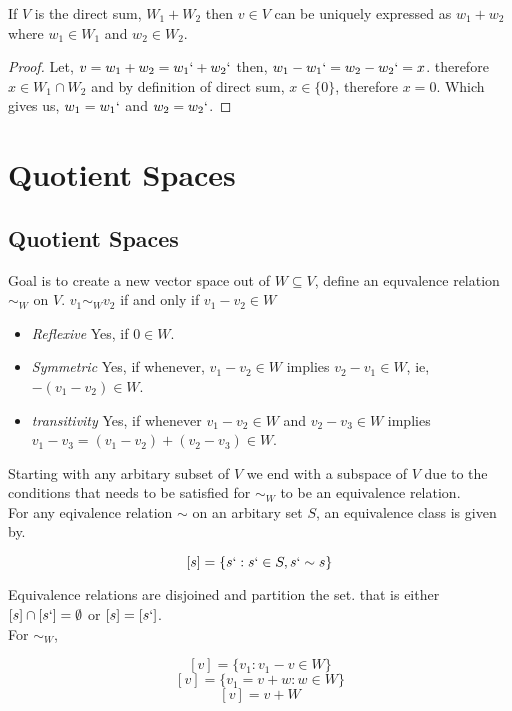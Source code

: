 \documentclass[11pt,a4paper]{colorart}
\def\l{\left}
\def\r{\right}
\def\es{\emptyset}
\begin{document}
\begin{proposition}
	If $V$ is the direct sum, $W_1+W_2$ then $v\in V$ can be uniquely expressed as $w_1+w_2$ where $w_1\in W_1$ and $w_2\in W_2$.
\end{proposition}

\begin{proof}
	Let, $v = w_1 + w_2 = w_1` + w_2`$ then, $w_1 - w_1` = w_2 - w_2` = x$. therefore $x\in W_1 \cap W_2$ and by definition of direct sum, $x \in \{0\}$, therefore $x=0$. Which gives us, $w_1 = w_1`$ and $w_2=w_2`$.
\end{proof}

\section{Quotient Spaces}

\subsection{Quotient Spaces}

Goal is to create a new vector space out of $W\subseteq V$, define an equvalence relation $\sim _W$ on $V$. $v_1 \sim_W v_2$ if and only if $v_1-v_2\in W$

\begin{itemize}
	\item \textit{Reflexive}
		Yes, if $0\in W$.
	\item \textit{Symmetric}
		Yes, if whenever, $v_1-v_2\in W$ implies $v_2-v_1\in W$, ie, $-\l(v_1-v_2\r)\in W$.
	\item \textit{transitivity}
		Yes, if whenever $v_1-v_2\in W$ and $v_2-v_3\in W$ implies $v_1-v_3 = \l(v_1-v_2\r) + \l(v_2-v_3\r) \in W$.
\end{itemize}

Starting with any arbitary subset of $V$ we end with a subspace of $V$ due to the conditions that needs to be satisfied for $\sim_W$ to be an equivalence relation.\\

For any eqivalence relation $\sim$ on an arbitary set $S$, an equivalence class is given by.

\[ \l[s\r] = \{s`:s`\in S, s` \sim s \} \]

Equivalence relations are disjoined and partition the set. that is either $\l[s\r]\cap\l[s`\r]=\es$ or $\l[s\r]=\l[s`\r]$.\\

For $\sim_W$,

\[ \l[v\r] = \{ v_1:v_1-v\in W\} \]
\[ \l[v\r] = \{ v_1=v+w : w\in W\} \]
\[ \l[v\r] = v+W\]
\end{document}
